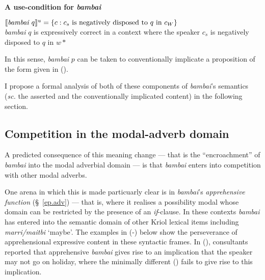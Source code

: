 \pex \textbf{A use-condition for \textit{bambai}}

$ \denote[u]{\textit{bambai }q}=\{c:c_s\text{ is negatively disposed to $ q $ in }c_W\} $\\
\textit{bambai} $ q$ is expressively correct in a context where the speaker $ c_s $ is negatively disposed to $ q $ in $ w* $
\xe


\noindent In this sense, \textit{bambai} $ p $ can be taken to conventionally implicate a proposition of the form given in (\lastx).





 I propose a formal analysis of both of these components of \textit{bambai}'s semantics (\textit{sc.} the asserted and the conventionally implicated content) in the following section.




\subsection{Competition in the modal-adverb domain}

A predicted consequence of this meaning change --- that is the ``encroachment'' of \textit{bambai} into the modal adverbial domain --- is that \textit{bambai} enters into competition with other modal adverbs. 

One arena in which this is made particuarly clear is in \textit{bambai}'s \textit{apprehensive function} (\S~\ref{ep.adv}) --- that is, where it realises a possibility modal whose domain can be restricted by the presence of an \textit{if}-clause. In these contexts \textit{bambai} has entered into the semantic domain of other Kriol lexical items including \textit{marri/maitbi} `maybe'.  The examples in (-) below show the perseverance of apprehensional expressive content in these syntactic frames. In (), consultants reported that apprehensive \textit{bambai} gives rise to an implication that the speaker may not go on holiday, where the minimally different () fails to give rise to this implication.

